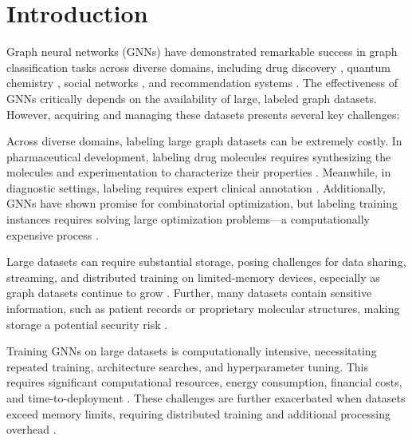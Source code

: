 \section{Introduction}

Graph neural networks (GNNs) have demonstrated remarkable success in graph classification tasks across diverse domains, including drug discovery \citep{gaudelet2021utilizing}, quantum chemistry \citep{stuyver2022quantum}, social networks \citep{awasthi2023gnn}, and recommendation systems \citep{sharma2024survey}. The effectiveness of GNNs critically depends on the availability of large, labeled graph datasets. However, acquiring and managing these datasets presents several key challenges:

\begin{description}[leftmargin=1.5em, labelindent=1.5em]
\item[Cost of Graph Labeling.]  Across diverse domains, labeling large graph datasets can be extremely costly. In pharmaceutical development, labeling drug molecules requires synthesizing the molecules and experimentation to characterize their properties \citep{gaudelet2021utilizing}. Meanwhile, in diagnostic settings, labeling requires expert clinical annotation \citep{li_graph_2022}. Additionally, GNNs have shown promise for combinatorial optimization, but labeling training instances requires solving large optimization problems---a computationally expensive process \citep{Cappart23:Combinatorial}.

\item[Data Storage and Streaming.] Large datasets can require substantial storage, posing challenges for data sharing, streaming, and distributed training on limited-memory devices, especially as graph datasets continue to grow \citep{zeng_gnn_2023, liu_federated_2024}. Further, many datasets contain sensitive information, such as patient records or proprietary molecular structures, making storage a potential security risk \citep{gaudelet2021utilizing, li_graph_2022}. 
    
\item[Cost of GNN Training.] Training GNNs on large datasets is computationally intensive, necessitating repeated training, architecture searches, and hyperparameter tuning. This requires significant computational resources, energy consumption, financial costs, and time-to-deployment \citep{khemani_review_2024}.  These challenges are further exacerbated when datasets exceed memory limits, requiring distributed training and additional processing overhead \citep{strubell2020energy, zeng_gnn_2023, tripathy_reducing_2020, liu_federated_2024}.

\end{description}

